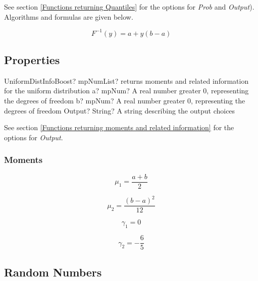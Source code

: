 \vspace{0.3cm}
See section \ref{Functions returning Quantiles} for the options for  {\itshape\sffamily Prob} and {\itshape\sffamily Output}). Algorithms and formulas are given below.

\begin{equation} 
	F^{-1}(y)= a+y(b-a)
\end{equation}



\subsection{Properties}
\label{UniformDistributionProperties}

\begin{mpFunctionsExtract}
	\mpFunctionThree
	{UniformDistInfoBoost? mpNumList? returns moments and related information for the uniform distribution}
	{a? mpNum? A real number greater 0, representing the degrees of freedom}
	{b? mpNum? A real number greater 0, representing the degrees of freedom}
	{Output? String? A string describing the output choices}
\end{mpFunctionsExtract}

\vspace{0.3cm}

See section \ref{Functions returning moments and related information} for the options for {\itshape\sffamily Output}. 


\subsubsection{Moments}

\begin{equation} 
	\mu_1 = \frac{a+b}{2}
\end{equation}

\begin{equation} 
	\mu_2 = \frac{(b-a)^2}{12}
\end{equation}

\begin{equation} 
	\gamma_1 = 0
\end{equation}

\begin{equation} 
	\gamma_2 = -\frac{6}{5}
\end{equation}



\subsection{Random Numbers}

